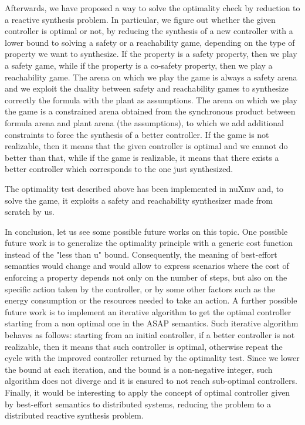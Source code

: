 Afterwards, we have proposed a way to solve the optimality check by reduction to a reactive synthesis problem. In particular, we figure out whether the given controller is optimal or not, by reducing the synthesis of a new controller with a lower bound to solving a safety or a reachability game, depending on the type of property we want to synthesize. If the property is a safety property, then we play a safety game, while if the property is a co-safety property, then we play a reachability game.
The arena on which we play the game is always a safety arena and we exploit the duality between safety and reachability games to synthesize correctly the formula with the plant as assumptions. The arena on which we play the game is a constrained arena obtained from the synchronous product between formula arena and plant arena (the assumptions), to which we add additional constraints to force the synthesis of a better controller. If the game is not realizable, then it means that the given controller is optimal and we cannot do better than that, while if the game is realizable, it means that there exists a better controller which corresponds to the one just synthesized. 

The optimality test described above has been implemented in nuXmv and, to solve the game, it exploits a safety and reachability synthesizer made from scratch by us.

In conclusion, let us see some possible future works on this topic.
One possible future work is to generalize the optimality principle with a generic cost function instead of the "less than u" bound.
Consequently, the meaning of best-effort semantics would change and would allow to express scenarios where the cost of enforcing a property depends not only on the number of steps, but also on the specific action taken by the controller, or by some other factors such as the energy consumption or the resources needed to take an action.
A further possible future work is to implement an iterative algorithm to get the optimal controller starting from a non optimal one in the ASAP semantics.
Such iterative algorithm behaves as follows: starting from an initial controller, if a better controller is not realizable, then it means that such controller is optimal, otherwise repeat the cycle with the improved controller returned by the optimality test.
Since we lower the bound at each iteration, and the bound is a non-negative integer, such algorithm does not diverge and it is ensured to not reach sub-optimal controllers.
Finally, it would be interesting to apply the concept of optimal controller given by best-effort semantics to distributed systems, reducing the problem to a distributed reactive synthesis problem.
